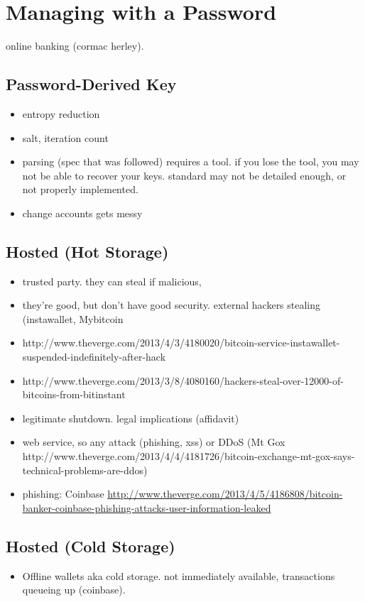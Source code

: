 
\section{Managing with a Password}

\cf online banking (cormac herley).


\subsection{Password-Derived Key} 

\begin{itemize}
  \item entropy reduction
  \item salt, iteration count
  \item parsing (spec that was followed) requires a tool. if you lose the tool, you may not be able to recover your keys. standard may not be detailed enough, or not properly implemented.
  \item change accounts gets messy
\end{itemize}


\subsection{Hosted (Hot Storage)} 

\begin{itemize}
  \item trusted party. they can steal if malicious,
  \item they're good, but don't have good security. external hackers stealing (instawallet, Mybitcoin %
  \item http://www.theverge.com/2013/4/3/4180020/bitcoin-service-instawallet-suspended-indefinitely-after-hack
  \item http://www.theverge.com/2013/3/8/4080160/hackers-steal-over-12000-of-bitcoins-from-bitinstant
  \item legitimate shutdown. legal implications (affidavit)
  \item web service, so any attack (phishing, xss) or DDoS (Mt Gox http://www.theverge.com/2013/4/4/4181726/bitcoin-exchange-mt-gox-says-technical-problems-are-ddos)
  \item phishing: Coinbase \url{http://www.theverge.com/2013/4/5/4186808/bitcoin-banker-coinbase-phishing-attacks-user-information-leaked}
\end{itemize}


\subsection{Hosted (Cold Storage)} 

\begin{itemize}
  \item Offline wallets aka cold storage. not immediately available, transactions queueing up (coinbase). 
\end{itemize}

